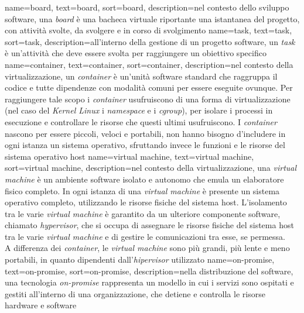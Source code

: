 {
    name={board},
    text=board,
    sort=board,
    description={nel contesto dello sviluppo software, una \textit{board} è una bacheca virtuale riportante 
    una istantanea del progetto, con attività svolte, da svolgere e in corso di svolgimento}
}
{
    name={task},
    text=task,
    sort=task,
    description={all'interno della gestione di un progetto software, un \textit{task} è un'attività che deve essere svolta per raggiungere un obiettivo specifico}
}
{
    name={container},
    text=container,
    sort=container,
    description={nel contesto della virtualizzazione, un \textit{container} è un'unità software standard che raggruppa il codice e tutte 
    dipendenze con modalità comuni per essere eseguite ovunque. Per raggiungere tale scopo i \textit{container} usufruiscono di una forma 
    di virtualizzazione (nel caso del \textit{Kernel Linux} i \textit{namespace} e i \textit{cgroup}), per isolare i processi in esecuzione 
    e controllare le risorse che questi ultimi usufruiscono.
    I \textit{container} nascono per essere piccoli, veloci e portabili, non hanno bisogno d'includere in ogni istanza un sistema operativo,
    sfruttando invece le funzioni e le risorse del sistema operativo host}
}
{
    name={virtual machine},
    text=virtual machine,
    sort=virtual machine,
    description={nel contesto della virtualizzazione, una \textit{virtual machine} è un ambiente software isolato e autonomo che emula un elaboratore fisico completo.
    In ogni istanza di una \textit{virtual machine} è presente un sistema operativo completo, utilizzando le risorse 
    fisiche del sistema host. L'isolamento tra le varie \textit{virtual machine} è garantito da un 
    ulteriore componente software, chiamato \textit{hypervisor}, che si occupa di assegnare le risorse fisiche del sistema host tra le varie \textit{virtual machine} e di gestire le comunicazioni tra esse, se permessa.\\
    A differenza dei \textit{container}, le \textit{virtual machine} sono più grandi, più lente e meno portabili, in quanto dipendenti dall'\textit{hipervisor} utilizzato}
}
{
    name={on-promise},
    text=on-promise,
    sort=on-promise,
    description={nella distribuzione del software, una tecnologia \textit{on-promise} rappresenta
    un modello in cui i servizi sono ospitati e gestiti all'interno di una 
    organizzazione, che detiene e controlla le risorse hardware e software}
}

